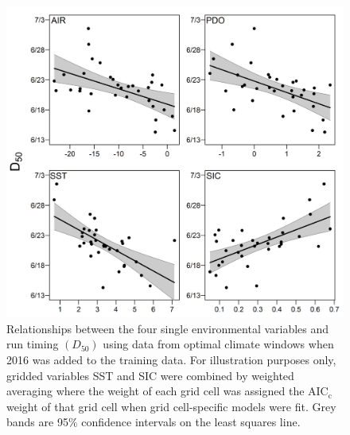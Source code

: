 \documentclass[12pt,]{book}
\theoremstyle{definition}
\theoremstyle{definition}
\theoremstyle{definition}
\theoremstyle{remark}
\begin{document}
\begin{figure}
  \centering
  \includegraphics{img/Ch2/relationships.png}
  \caption{Relationships between the four single environmental variables and run timing $\left(D_{50}\right)$ using data from optimal climate windows when 2016 was added to the training data. For illustration purposes only, gridded variables SST and SIC were combined by weighted averaging where the weight of each grid cell was assigned the $\text{AIC}_{\text{c}}$ weight of that grid cell when grid cell-specific models were fit. Grey bands are 95$\%$ confidence intervals on the least squares line.}
  \label{fig:relationships}
\end{figure}

\pagebreak
\end{document}
